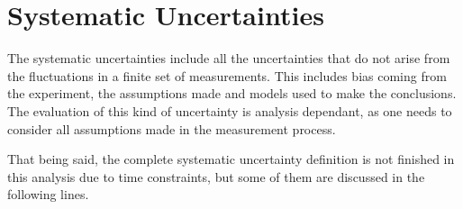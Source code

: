 \section{Systematic Uncertainties}

The systematic uncertainties include all the uncertainties that do not arise from the fluctuations in a finite set of measurements. This includes bias coming from the experiment, the assumptions made and models used to make the conclusions. The evaluation of this kind of uncertainty is analysis dependant, as one needs to consider all assumptions made in the measurement process.

That being said, the complete systematic uncertainty definition is not finished in this analysis due to time constraints, but some of them are discussed in the following lines.

